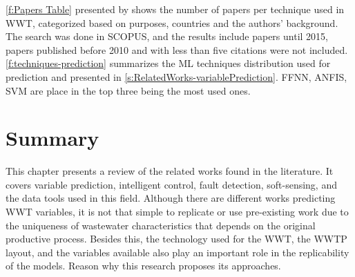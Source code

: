 \autoref{f:Papers Table} presented by \cite{Corominas2018} shows the number of papers per technique used in \ac{WWT}, categorized based on purposes, countries and the authors' background. The search was done in SCOPUS, and the results include papers until 2015, papers published before 2010 and with less than five citations were not included. \autoref{f:techniques-prediction} summarizes the \ac{ML} techniques distribution used for prediction and presented in \autoref{s:RelatedWorks-variablePrediction}. \ac{FFNN}, \ac{ANFIS}, \ac{SVM} are place in the top three being the most used ones.

\section{Summary}
\label{s:Related-Works-Summary}

This chapter presents a review of the related works found in the literature. It covers variable prediction, intelligent control, fault detection, soft-sensing, and the data tools used in this field. Although there are different works predicting \ac{WWT} variables, it is not that simple to replicate or use pre-existing work due to the uniqueness of wastewater characteristics that depends on the original productive process. Besides this, the technology used for the \ac{WWT}, the \ac{WWTP} layout, and the variables available also play an important role in the replicability of the models. Reason why  this research proposes its approaches.